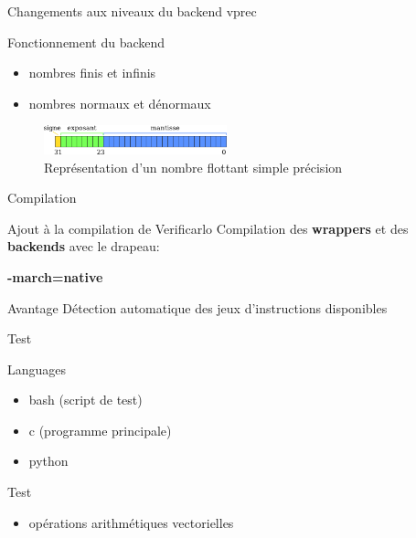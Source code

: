 \documentclass{beamer}
\begin{document}
\begin{frame}{Changements aux niveaux du backend vprec}

  \begin{block}{Fonctionnement du backend}
    \begin{itemize}
    \item nombres finis et infinis
    \item nombres normaux et dénormaux
    \end{itemize}
  \end{block}

  \begin{figure}
    \centering
    \includegraphics[width=200px]{../ressources/IEEE754_simple_precision.png}
    \caption{\label{fig:ieee_simple_precision}Représentation d'un nombre flottant simple précision}
  \end{figure}

\end{frame}

\begin{frame}{Compilation}

  \begin{block}{Ajout à la compilation de Verificarlo}
    Compilation des \textbf{wrappers} et des \textbf{backends} avec le drapeau:
    \begin{center}
      \textbf{-march=native}
    \end{center}
  \end{block}

  \begin{block}{Avantage}
    Détection automatique des jeux d'instructions disponibles
  \end{block}


\end{frame}

\begin{frame}{Test}

  \begin{block}{Languages}
    \begin{itemize}
    \item bash (script de test)
    \item c (programme principale)
    \item python
    \end{itemize}
  \end{block}

  \begin{block}{Test}
    \begin{itemize}
    \item opérations arithmétiques vectorielles
    \end{itemize}
  \end{block}

\end{frame}
\end{document}
